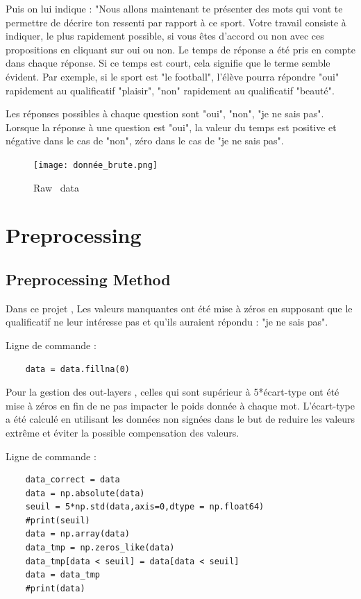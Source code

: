\documentclass[12pt]{article}
\begin{document}
Puis on lui indique :
"Nous allons maintenant te présenter des mots qui vont te permettre de décrire ton ressenti par rapport à ce sport. Votre travail consiste à indiquer, le plus rapidement possible, si vous êtes d'accord ou non avec ces propositions en cliquant sur oui ou non.
Le temps de réponse a été pris en compte dans chaque réponse. Si ce temps est court, cela signifie que le terme semble évident.
Par exemple, si le sport est "le football", l'élève pourra répondre "oui" rapidement au qualificatif "plaisir", "non" rapidement au qualificatif "beauté".

Les réponses possibles à chaque question sont "oui", "non", "je ne sais pas". Lorsque la réponse à une question est "oui", la valeur du temps est positive et négative dans le cas de "non", zéro dans le cas de "je ne sais pas".



\begin{figure}[h]
\begin{center}
\texttt{[image: donnée\_brute.png]} 
\caption[]{ Raw \ data}
\end{center}
\end{figure}


\section{Preprocessing}

\subsection{Preprocessing Method}

Dans ce projet , Les valeurs manquantes ont été mise à zéros en supposant que le qualificatif ne leur intéresse pas et qu'ils auraient répondu : "je ne sais pas".

Ligne de  commande : 

\begin{lstlisting}
    data = data.fillna(0)
\end{lstlisting}


Pour la gestion des out-layers , celles qui sont  supérieur à 5*écart-type ont été mise à zéros en fin de ne pas impacter le poids donnée à chaque  mot. L'écart-type a été calculé en utilisant les données non signées dans le but de reduire les valeurs extrême et éviter la possible compensation des valeurs.

Ligne de  commande : 

\begin{lstlisting}
    data_correct = data
    data = np.absolute(data)
    seuil = 5*np.std(data,axis=0,dtype = np.float64)
    #print(seuil)
    data = np.array(data)
    data_tmp = np.zeros_like(data)
    data_tmp[data < seuil] = data[data < seuil]
    data = data_tmp
    #print(data)
\end{lstlisting}
\end{document}
